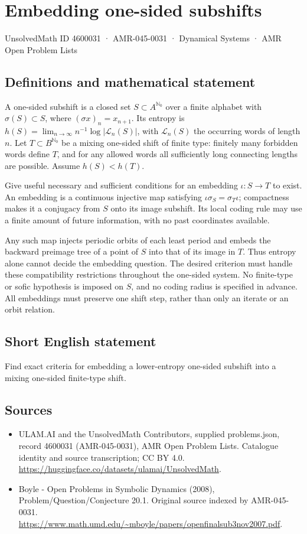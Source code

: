 \documentclass[11pt,a4paper]{article}
\begin{document}
\section*{Embedding one-sided subshifts}\label{4600031}
{\small UnsolvedMath ID 4600031 · AMR-045-0031 · Dynamical Systems · AMR Open Problem Lists}
\subsection{Definitions and mathematical statement}
A one-sided subshift is a closed set $S\subset A^{\mathbb N_0}$ over
a finite alphabet with $\sigma(S)\subset S$, where $(\sigma x)_n=x_{n+1}$.
Its entropy is $h(S)=\lim_{n\to\infty}n^{-1}\log|\mathcal L_n(S)|$,
with $\mathcal L_n(S)$ the occurring words of length $n$.
Let $T\subset B^{\mathbb N_0}$ be a mixing one-sided shift of finite
type: finitely many forbidden words define $T$, and for any allowed
words all sufficiently long connecting lengths are possible.
Assume $h(S)<h(T)$.

Give useful necessary and sufficient conditions for an embedding
$\iota:S\to T$ to exist. An embedding is a continuous injective map
satisfying $\iota\sigma_S=\sigma_T\iota$; compactness makes it a
conjugacy from $S$ onto its image subshift. Its local coding rule
may use a finite amount of future information, with no past
coordinates available.

Any such map injects periodic orbits of each least period and embeds
the backward preimage tree of a point of $S$ into that of its image
in $T$. Thus entropy alone cannot decide the embedding question.
The desired criterion must handle these compatibility restrictions
throughout the one-sided system. No finite-type or sofic hypothesis
is imposed on $S$, and no coding radius is specified in advance.
All embeddings must preserve one shift step, rather than only an
iterate or an orbit relation.
\subsection{Short English statement}
Find exact criteria for embedding a lower-entropy one-sided subshift into a mixing one-sided finite-type shift.
\subsection{Sources}
\begin{itemize}
\item[S1] ULAM.AI and the UnsolvedMath Contributors, supplied problems.json, record 4600031 (AMR-045-0031), AMR Open Problem Lists. Catalogue identity and source transcription; CC BY 4.0.
\url{https://huggingface.co/datasets/ulamai/UnsolvedMath}.
\item[S2] Boyle - Open Problems in Symbolic Dynamics (2008), Problem/Question/Conjecture 20.1. Original source indexed by AMR-045-0031.
\url{https://www.math.umd.edu/~mboyle/papers/openfinalsub3nov2007.pdf}.
\end{itemize}
\end{document}
